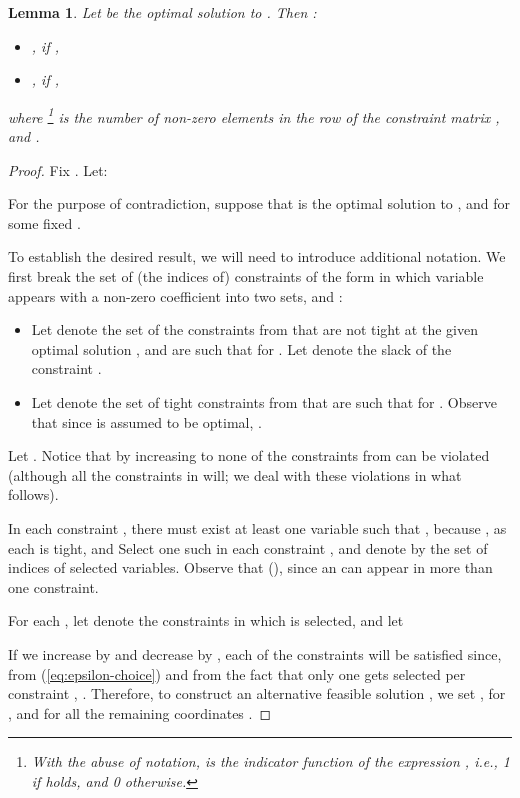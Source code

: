 \documentclass[11pt]{article}
\newtheorem{lemma}[theorem]{Lemma}
\newif\iffullpaper
\begin{document}
\begin{lemma}\label{lemma:lower-bound}
Let  be the optimal solution to . Then :
\begin{itemize}
\itemsep0pt
\item , if  ,
\item , if ,
\end{itemize}
where \footnote{With the abuse of notation,  is the indicator function of the expression , i.e., 1 if  holds, and 0 otherwise.} is the number of non-zero elements in the  row of the constraint matrix , and .
\end{lemma}
\iffullpaper
\begin{proof}
Fix . Let:


For the purpose of contradiction, suppose that  is the optimal solution to , and  for some fixed .  

To establish the desired result, we will need to introduce additional notation. We first break the set of (the indices of) constraints of the form  in which variable  appears with a non-zero coefficient into two sets,  and :
\begin{itemize}
\item Let  denote the set of the constraints from  that are not tight at the given optimal solution , and are such that  for . Let  denote the slack of the constraint .
\item Let  denote the set of tight constraints from  that are such that  for . Observe that since  is assumed to be optimal, .
\end{itemize}

Let . Notice that by increasing  to  none of the constraints from  can be violated (although all the constraints in  will; we deal with these violations in what follows).

In each constraint , there must exist at least one variable  such that , because , as each  is tight, and 
Select one such  in each constraint , and denote by  the set of indices of selected variables. Observe that  (), since an  can appear in more than one constraint. 

For each , let  denote the constraints in which  is selected, and let 

If we increase  by  and decrease  by  , each of the constraints  will be satisfied since, from (\ref{eq:epsilon-choice}) and from the fact that only one  gets selected per constraint , . Therefore, to construct an alternative feasible solution , we set ,  for , and  for all the remaining coordinates . 


\end{proof}
\end{document}
